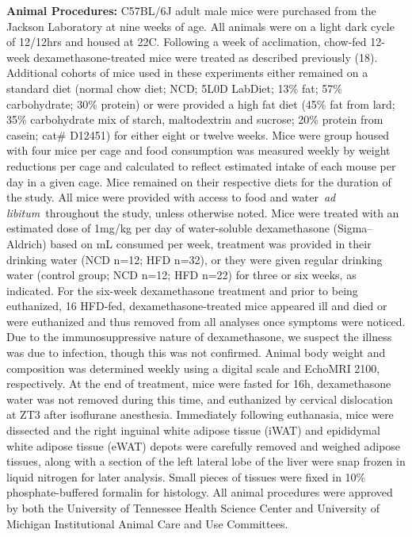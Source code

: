 \documentclass[11pt]{article} %
\begin{document}
\textbf{Animal Procedures:} C57BL/6J adult male mice were purchased from
the Jackson Laboratory at nine weeks of age. All animals were on a light
dark cycle of 12/12hrs and housed at 22\degree C. Following a week of
acclimation, chow-fed 12-week dexamethasone-treated mice were treated as
described previously (18). Additional cohorts of mice used in these
experiments either remained on a standard diet (normal chow diet; NCD;
5L0D LabDiet; 13\% fat; 57\% carbohydrate; 30\% protein) or were
provided a high fat diet (45\% fat from lard; 35\% carbohydrate mix of
starch, maltodextrin and sucrose; 20\% protein from casein; cat\#
D12451) for either eight or twelve weeks. Mice were group housed with
four mice per cage and food consumption was measured weekly by weight
reductions per cage and calculated to reflect estimated intake of each
mouse per day in a given cage. Mice remained on their respective diets
for the duration of the study. All mice were provided with access to
food and water~\emph{ad libitum}~throughout the study, unless otherwise
noted. Mice were treated with an estimated dose of 1mg/kg per day of
water-soluble dexamethasone (Sigma--Aldrich) based on mL consumed per
week, treatment was provided in their drinking water (NCD n=12; HFD
n=32), or they were given regular drinking water (control group; NCD
n=12; HFD n=22) for three or six weeks, as indicated. For the six-week
dexamethasone treatment and prior to being euthanized, 16 HFD-fed,
dexamethasone-treated mice appeared ill and died or were euthanized and
thus removed from all analyses once symptoms were noticed. Due to the
immunosuppressive nature of dexamethasone, we suspect the illness was
due to infection, though this was not confirmed. Animal body weight and
composition was determined weekly using a digital scale and EchoMRI
2100, respectively. At the end of treatment, mice were fasted for 16h,
dexamethasone water was not removed during this time, and euthanized by
cervical dislocation at ZT3 after isoflurane anesthesia. Immediately
following euthanasia, mice were dissected and the right inguinal white
adipose tissue (iWAT) and epididymal white adipose tissue (eWAT) depots
were carefully removed and weighed adipose tissues, along with a section
of the left lateral lobe of the liver were snap frozen in liquid
nitrogen for later analysis. Small pieces of tissues were fixed in 10\%
phosphate-buffered formalin for histology. All animal procedures were
approved by both the University of Tennessee Health Science Center and
University of Michigan Institutional Animal Care and Use Committees.
\end{document}
